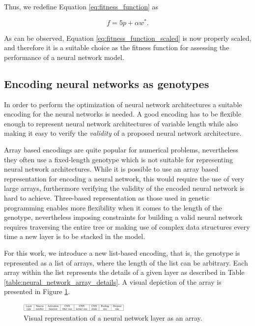 \documentclass[journal]{IEEEtran}
\begin{document}
Thus, we redefine Equation \ref{eq:fitness_function} as

\begin{equation}
f = 5p + \alpha w^*.
\label{eq:fitness_function_scaled}
\end{equation}

As can be observed, Equation \ref{eq:fitness_function_scaled} is now properly scaled, and therefore it is a suitable choice as the fitness function for assessing the performance of a neural network model.

\subsection{Encoding neural networks as genotypes}
\label{sec:encoding_nn}

In order to perform the optimization of neural network architectures a suitable encoding for the neural networks is needed. A good encoding has to be flexible enough to represent neural network architectures of variable length while also making it easy to verify the \textit{validity} of a proposed neural network architecture. 

Array based encodings are quite popular for numerical problems, nevertheless they often use a fixed-length genotype which is not suitable for representing neural network architectures. While it is possible to use an array based representation for encoding a neural network, this would require the use of very large arrays, furthermore verifying the validity of the encoded neural network is hard to achieve. Three-based representation as those used in genetic programming \cite{Engelbrecht2007} enables more flexibility when it comes to the length of the genotype, nevertheless imposing constraints for building a valid neural network requires traversing the entire tree or making use of complex data structures every time a new layer is to be stacked in the model. 

For this work, we introduce a new list-based encoding, that is, the genotype is represented as a list of arrays, where the length of the list can be arbitrary. Each array within the list represents the details of a given layer as described in Table \ref{table:neural_network_array_details}. A visual depiction of the array is presented in Figure \ref{fig:neural_network_array}.

\begin{figure}[!htb]
\centering
\includegraphics[width=0.48\textwidth]{img/array_layer.png}
\caption{Visual representation of a neural network layer as an array.}
\label{fig:neural_network_array}
\end{figure}
\end{document}
